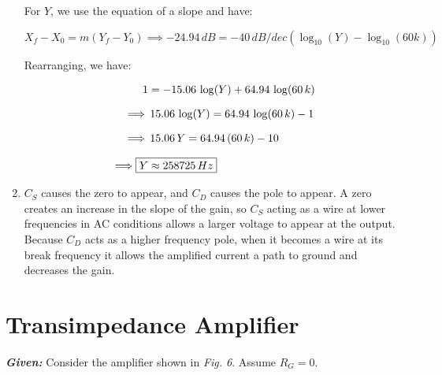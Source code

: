 \documentclass[12pt, fleqn]{article}
\begin{document}
\begin{enumerate}[label=(\alph*)]
{    For $Y$, we use the equation of a slope and have:
    
    \begin{equation}
        X_f - X_0 = m(Y_f - Y_0) \implies -24.94\,dB = -40\,dB/dec(\log_{10}(Y) - \log_{10}(60k))
    \end{equation}
    
    Rearranging, we have:
    
    \begin{align*}
        1 &= -15.06\,\log(Y) + 64.94\,\log(60\,k)\\[0.25cm]
        \implies &\, 15.06\,\log(Y) = 64.94\,\log(60\,k) - 1\\[0.25cm]
        \implies &\, 15.06\,Y = 64.94\,(60\,k) - 10\\[0.25cm]
        \implies \Aboxed{Y &\approx 258725\,Hz}
    \end{align*}
    }
    \item
    {
    $C_S$ causes the zero to appear, and $C_D$ causes the pole to appear.  A zero creates an increase in the slope of the gain, so $C_S$ acting as a wire at lower frequencies in AC conditions allows a larger voltage to appear at the output.  Because $C_D$ acts as a higher frequency pole, when it becomes a wire at its break frequency it allows the amplified current a path to ground and decreases the gain.
    }
\end{enumerate}
\newpage
\section{Transimpedance Amplifier}
\textbf{\emph{Given: }} Consider the amplifier shown in \textit{Fig. 6}.  Assume $R_G = 0$.
\end{document}

